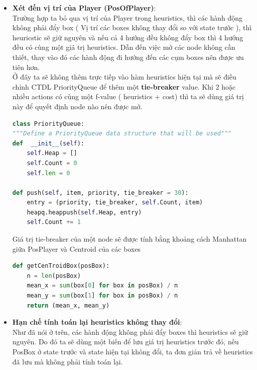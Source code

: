 \documentclass[12pt]{article}
\begin{document}
\begin{itemize}
	\item \textbf{Xét đến vị trí của Player (PosOfPlayer)}: \\
	Trường hợp ta bỏ qua vị trí của Player trong heuristics, thì các hành động không phải đẩy box ( Vị trí các boxes không thay đổi so với state trước ), thì heuricstic sẽ giữ nguyên và nếu cả 4 hướng đều không đẩy box thì 4 hướng đều có cùng một giá trị heuristics. Dẫn đến việc mở các node không cần thiết, thay vào đó các hành động đi hướng đến các cụm boxes nên được ưu tiên hơn. \\

	Ở đây ta sẽ không thêm trực tiếp vào hàm heuristics hiện tại mà sẽ điều chỉnh CTDL PriorityQueue để thêm một \textbf{tie-breaker} value. Khi 2 hoặc nhiều actions có cùng một f-value ( heuristics + cost) thì ta sẽ dùng giá trị này để quyết định node nào nên được mở.

	\begin{tcolorbox}[boxrule=0.5pt, colback=white]
		\begin{lstlisting}[language=python, numbers=none, basicstyle=\ttfamily\footnotesize]
class PriorityQueue:
"""Define a PriorityQueue data structure that will be used"""
def  __init__(self):
	self.Heap = []
	self.Count = 0
	self.len = 0

def push(self, item, priority, tie_breaker = 30):
	entry = (priority, tie_breaker, self.Count, item)
	heapq.heappush(self.Heap, entry)
	self.Count += 1
		\end{lstlisting}
	\end{tcolorbox}

	Giá trị tie-breaker của một node sẽ được tính bằng khoảng cách Manhattan giữa PosPlayer và Centroid của các boxes
	\begin{tcolorbox}[boxrule=0.5pt, colback=white]
		\begin{lstlisting}[language=python, numbers=none, basicstyle=\ttfamily\footnotesize]
def getCenTroidBox(posBox):
	n = len(posBox)
	mean_x = sum(box[0] for box in posBox) / n
	mean_y = sum(box[1] for box in posBox) / n
	return (mean_x, mean_y)
		\end{lstlisting}
	\end{tcolorbox}

	\item \textbf{Hạn chế tính toán lại heuristics không thay đổi}: \\
	Như đã nói ở trên, các hành động không phải đẩy boxes thì heuristics sẽ giữ nguyên. Do đó ta sẽ dùng một biến để lưu giá trị heuristics trước đó, nếu PosBox ở state trước và state hiện tại không đổi, ta đơn giản trả về heuristics đã lưu mà không phải tính toán lại.
	

\end{itemize}
\end{document}

